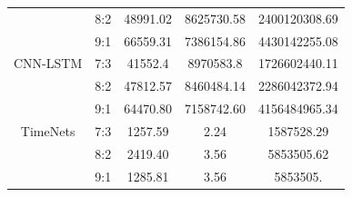 \documentclass[conference]{IEEEtran}
\begin{document}
\begin{table}[H]
\begin{adjustbox}{width=0.4\textwidth}
\begin{tabular}{|c|c|c|c|c|}
& 8:2 & 48991.02 & 8625730.58 & 2400120308.69 \\
& 9:1 & 66559.31 & 7386154.86 & 4430142255.08 \\ \hline   
CNN-LSTM & 7:3 & 41552.4 & 8970583.8 & 1726602440.11 \\
& 8:2 & 47812.57 & 8460484.14 & 2286042372.94 \\
& 9:1 & 64470.80 & 7158742.60 & 4156484965.34 \\ \hline
TimeNets & 7:3 & 1257.59 & 2.24 & 1587528.29 \\
& 8:2 & 2419.40 & 3.56 & 5853505.62 \\
& 9:1 & 1285.81 & 3.56 & 5853505. \\ \hline
\end{tabular}
\end{adjustbox}
\end{table}
\end{document}
